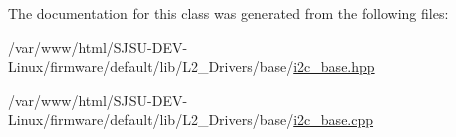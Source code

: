 The documentation for this class was generated from the following files\+:\begin{DoxyCompactItemize}
\item 
/var/www/html/\+S\+J\+S\+U-\/\+D\+E\+V-\/\+Linux/firmware/default/lib/\+L2\+\_\+\+Drivers/base/\hyperlink{i2c__base_8hpp}{i2c\+\_\+base.\+hpp}\item 
/var/www/html/\+S\+J\+S\+U-\/\+D\+E\+V-\/\+Linux/firmware/default/lib/\+L2\+\_\+\+Drivers/base/\hyperlink{i2c__base_8cpp}{i2c\+\_\+base.\+cpp}\end{DoxyCompactItemize}
